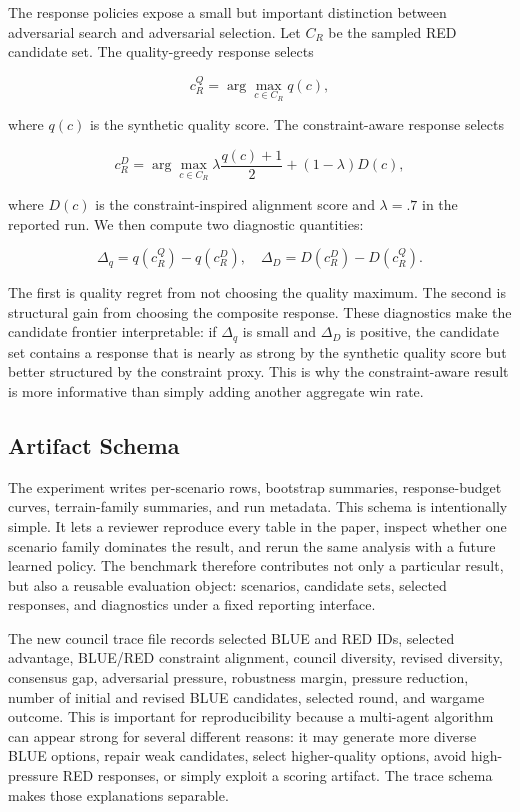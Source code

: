 \documentclass[letterpaper]{article} %
\begin{document}
The response policies expose a small but important distinction between adversarial search and adversarial selection. Let $C_R$ be the sampled RED candidate set. The quality-greedy response selects

\begin{equation}
c_R^Q = \arg\max_{c \in C_R} q(c),
\end{equation}

where $q(c)$ is the synthetic quality score. The constraint-aware response selects

\begin{equation}
c_R^D = \arg\max_{c \in C_R} \lambda \frac{q(c)+1}{2} + (1-\lambda)D(c),
\end{equation}

where $D(c)$ is the constraint-inspired alignment score and $\lambda=.7$ in the reported run. We then compute two diagnostic quantities:

\begin{equation}
\Delta_q = q(c_R^Q) - q(c_R^D), \quad
\Delta_D = D(c_R^D) - D(c_R^Q).
\end{equation}

The first is quality regret from not choosing the quality maximum. The second is structural gain from choosing the composite response. These diagnostics make the candidate frontier interpretable: if $\Delta_q$ is small and $\Delta_D$ is positive, the candidate set contains a response that is nearly as strong by the synthetic quality score but better structured by the constraint proxy. This is why the constraint-aware result is more informative than simply adding another aggregate win rate.

\subsection{Artifact Schema}

The experiment writes per-scenario rows, bootstrap summaries, response-budget curves, terrain-family summaries, and run metadata. This schema is intentionally simple. It lets a reviewer reproduce every table in the paper, inspect whether one scenario family dominates the result, and rerun the same analysis with a future learned policy. The benchmark therefore contributes not only a particular result, but also a reusable evaluation object: scenarios, candidate sets, selected responses, and diagnostics under a fixed reporting interface.

The new council trace file records selected BLUE and RED IDs, selected advantage, BLUE/RED constraint alignment, council diversity, revised diversity, consensus gap, adversarial pressure, robustness margin, pressure reduction, number of initial and revised BLUE candidates, selected round, and wargame outcome. This is important for reproducibility because a multi-agent algorithm can appear strong for several different reasons: it may generate more diverse BLUE options, repair weak candidates, select higher-quality options, avoid high-pressure RED responses, or simply exploit a scoring artifact. The trace schema makes those explanations separable.
\end{document}
